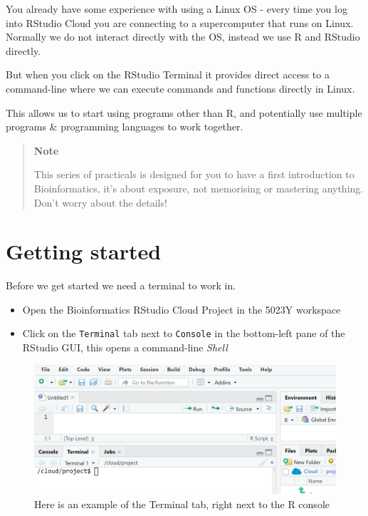 \documentclass[
]{book}
\begin{document}
You already have some experience with using a Linux OS - every time you log into RStudio Cloud you are connecting to a supercomputer that runs on Linux. Normally we do not interact directly with the OS, instead we use R and RStudio directly.

But when you click on the RStudio Terminal it provides direct access to a command-line where we can execute commands and functions directly in Linux.

This allows us to start using programs other than R, and potentially use multiple programs \& programming languages to work together.

\begin{quote}
\textbf{Note}

This series of practicals is designed for you to have a first introduction to Bioinformatics, it's about exposure, not memorising or mastering anything. Don't worry about the details!
\end{quote}

\hypertarget{getting-started}{%
\section{Getting started}\label{getting-started}}

Before we get started we need a terminal to work in.

\begin{itemize}
\item
  Open the Bioinformatics RStudio Cloud Project in the 5023Y workspace
\item
  Click on the \texttt{Terminal} tab next to \texttt{Console} in the bottom-left pane of the RStudio GUI, this opens a command-line \emph{Shell}
\end{itemize}

\begin{figure}

{\centering \includegraphics[width=0.8\linewidth]{images/terminal} 

}

\caption{Here is an example of the Terminal tab, right next to the R console}\label{fig:unnamed-chunk-81}
\end{figure}
\end{document}
